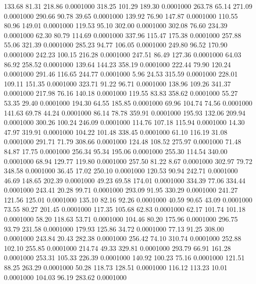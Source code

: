  133.68   81.31  218.86   0.0001000
 318.25  101.29  189.30   0.0001000
 263.78   65.14  271.09   0.0001000
 290.66   90.78   39.65   0.0001000
 139.92   76.90  147.87   0.0001000
 110.55   80.96  149.01   0.0001000
 119.53   95.10  302.00   0.0001000
 302.08   76.60  234.39   0.0001000
  62.30   80.79  114.69   0.0001000
 337.96  115.47  175.38   0.0001000
 257.88   55.06  321.39   0.0001000
 285.23   94.77  106.05   0.0001000
 249.80   96.52  170.90   0.0001000
 242.23  100.15  216.28   0.0001000
 247.51   86.49  127.36   0.0001000
  64.03   86.92  258.52   0.0001000
 139.64  144.23  358.19   0.0001000
 222.44   79.90  120.24   0.0001000
 291.46  116.65  244.77   0.0001000
   5.96   24.53  315.59   0.0001000
 228.01  109.11  151.35   0.0001000
 323.71   91.22   96.71   0.0001000
 138.96  109.26  341.37   0.0001000
 217.98   76.16  140.18   0.0001000
 119.55   83.83  358.62   0.0001000
  55.27   53.35   29.40   0.0001000
 194.30   64.55  185.85   0.0001000
  69.96  104.74   74.56   0.0001000
 141.63   69.78   44.24   0.0001000
  86.14   78.78  359.91   0.0001000
 195.93  132.06  209.94   0.0001000
 300.26  100.24  246.09   0.0001000
 114.76  107.18  115.94   0.0001000
  14.30   47.97  319.91   0.0001000
 104.22  101.48  338.45   0.0001000
  61.10  116.19   31.08   0.0001000
 291.71   71.79  308.66   0.0001000
 124.48  108.52  275.97   0.0001000
  71.48   84.87   17.75   0.0001000
 256.34   95.34  195.06   0.0001000
 255.30  114.54  340.00   0.0001000
  68.94  129.77  119.80   0.0001000
 257.50   81.22    8.67   0.0001000
 302.97   79.72  348.58   0.0001000
  36.45   17.02  250.10   0.0001000
 120.53   90.94  242.71   0.0001000
  46.69  148.65  202.39   0.0001000
  49.23   69.58  174.01   0.0001000
 334.39   77.06  334.44   0.0001000
 243.41   20.28   99.71   0.0001000
 293.09   91.95  330.29   0.0001000
 241.27  121.56  125.01   0.0001000
 135.10   82.16   92.26   0.0001000
  40.59   90.65   43.09   0.0001000
  73.55   80.27  201.45   0.0001000
 117.35  105.68   62.83   0.0001000
  62.17  101.74  101.18   0.0001000
  58.20  118.63   53.71   0.0001000
 104.46   80.20  175.96   0.0001000
 296.75   93.79  231.58   0.0001000
 179.93  125.86   34.72   0.0001000
  77.13   91.25  308.00   0.0001000
 243.84   20.43  282.38   0.0001000
 256.42   74.10  310.74   0.0001000
 252.88  102.10  255.85   0.0001000
 214.74   49.33  329.81   0.0001000
 293.79   66.91  161.28   0.0001000
 253.31  105.33  226.39   0.0001000
 140.92  100.23   75.16   0.0001000
 121.51   88.25  263.29   0.0001000
  50.28  118.73  128.51   0.0001000
 116.12  113.23   10.01   0.0001000
 104.03   96.19  283.62   0.0001000
